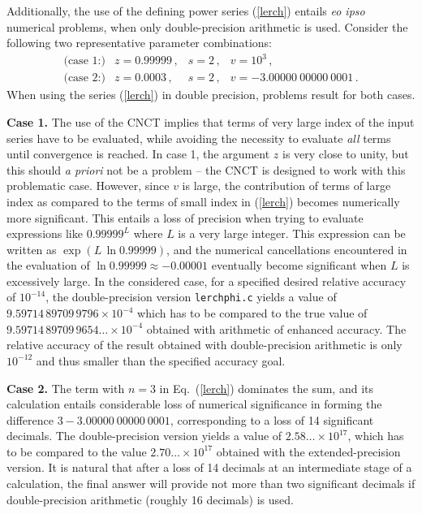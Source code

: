 \documentclass[11pt]{article}
\begin{document}
Additionally, the use of the defining power series
(\ref{lerch}) entails {\em eo ipso} numerical problems,
when only double-precision arithmetic is used.
Consider the following two representative parameter combinations:
%
\begin{equation}
\label{cases}
\begin{array}{clll}
\mbox{(case 1:)} & z = 0.99999\,, & s = 2\,, & v = 10^3\,,\\[1ex]
%
\mbox{(case 2:)} & z = 0.0003\,, & s = 2\,, & v = -3.00000~00000~0001\,.
\end{array}
\end{equation}
%
When using the series (\ref{lerch}) in double precision, problems
result for both cases. 

{\bf Case 1.} The use of the CNCT implies
that terms of very large index of the input series have to be evaluated,
while avoiding the necessity to evaluate {\em all} terms until convergence
is reached. In case 1, the argument $z$ is very close to unity, 
but this should {\em a priori} not be a problem -- the CNCT is designed
to work with this problematic case. However, since $v$ is large,
the contribution of terms of large index as compared to the terms
of small index in (\ref{lerch}) becomes numerically more significant. 
This entails a loss of precision when trying to evaluate expressions
like $0.99999^L$ where $L$ is a very large integer. This expression can be
written as $\exp(L \, \ln 0.99999)$, and the numerical cancellations
encountered in the evaluation of $\ln 0.99999 \approx - 0.00001$ eventually
become significant when $L$ is excessively large. 
In the considered case, for a specified desired 
relative accuracy of $10^{-14}$, the double-precision version
{\tt lerchphi.c} yields a value of $9.59714\,89709\,9796 \times 10^{-4}$
which has to be compared to the true value of 
$9.59714\,89709\,9654\dots \times 10^{-4}$ obtained with arithmetic of
enhanced accuracy. The relative accuracy of the result obtained with
double-precision arithmetic is only $10^{-12}$ and thus smaller than
the specified accuracy goal.

{\bf Case 2.} The term with $n=3$ in Eq.~(\ref{lerch}) dominates
the sum, and its calculation entails considerable loss of numerical
significance in forming the difference $3-3.00000~00000~0001$,
corresponding to a loss of 14 significant decimals.
The double-precision version yields a value of $2.58\dots \times 10^{17}$,
which has to be compared to the value $2.70\dots \times 10^{17}$ obtained
with the extended-precision version. It is natural that after a loss
of 14 decimals at an intermediate stage of a calculation, the final
answer will provide not more than two significant decimals if
double-precision arithmetic (roughly 16 decimals) is used.
\end{document}
